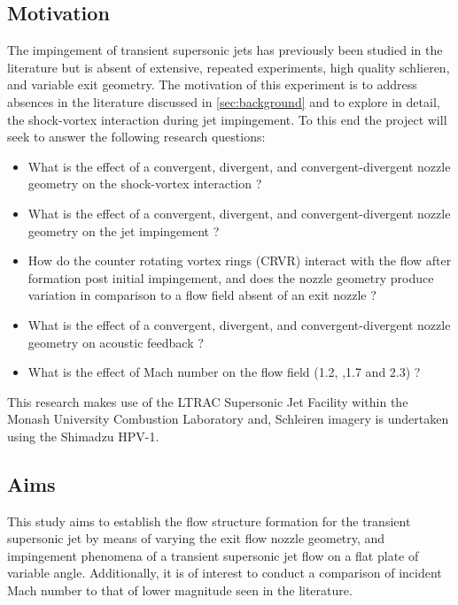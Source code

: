 \subsection{Motivation}
The impingement of transient supersonic jets has previously been studied in the literature but is absent of extensive, repeated experiments, high quality schlieren, and variable exit geometry. The motivation of this experiment is to address  absences in the literature discussed in \ref{sec:background} and to explore in detail, the shock-vortex interaction during jet impingement. To this end the project will seek to answer the following research questions:
\begin{itemize}
	\item What is the effect of a convergent, divergent, and convergent-divergent nozzle geometry on the shock-vortex interaction ?
	\item What is the effect of a convergent, divergent, and convergent-divergent nozzle geometry on the jet impingement ?
	\item How do the counter rotating vortex rings (CRVR) interact with the flow after formation post initial impingement, and does the nozzle geometry produce variation in comparison to a flow field absent of an exit nozzle ?
	\item What is the effect of a convergent, divergent, and convergent-divergent nozzle geometry on acoustic feedback ?
	\item What is the effect of Mach number on the flow field (1.2, ,1.7 and 2.3) ?
\end{itemize}

This research makes use of the LTRAC Supersonic Jet Facility within the Monash University Combustion Laboratory and, Schleiren imagery is undertaken using the Shimadzu HPV-1. 

\subsection{Aims}
This study aims to establish the flow structure formation for the transient supersonic jet by means of varying the exit flow nozzle geometry, and impingement phenomena of a transient supersonic jet flow on a flat plate of variable angle. Additionally, it is of interest to conduct a comparison of incident Mach number to that of lower magnitude seen in the literature.


\newpage

